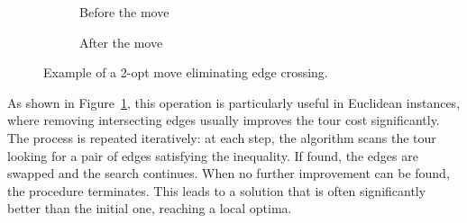 \begin{figure}[H]
    \centering
    \begin{subfigure}[c]{.4\textwidth}
        \centering
        \caption{Before the move}
    \end{subfigure}
    \hfill
    \begin{subfigure}[c]{.4\textwidth}
        \centering
        \caption{After the move}
    \end{subfigure}
    \caption{Example of a 2-opt move eliminating edge crossing.}
    \label{fig:2optmove}
\end{figure}


As shown in Figure~\ref{fig:2optmove}, this operation is particularly useful in Euclidean instances, where removing intersecting edges 
usually improves the tour cost significantly. The process is repeated iteratively: at each step, the algorithm scans the tour looking 
for a pair of edges satisfying the inequality. If found, the edges are swapped and the search continues. 
When no further improvement can be found, the procedure terminates. This leads to a solution that is often significantly better than the initial one, reaching a local optima.

